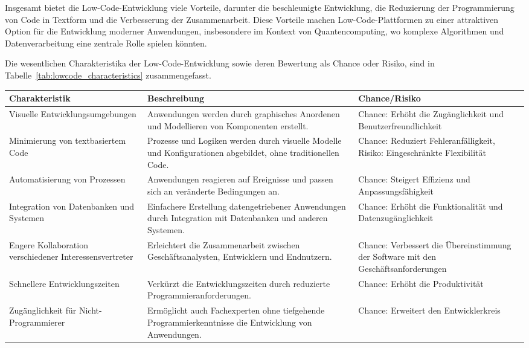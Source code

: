 Insgesamt bietet die Low-Code-Entwicklung viele Vorteile, darunter die beschleunigte Entwicklung, die Reduzierung 
der Programmierung von Code in Textform und die Verbesserung der Zusammenarbeit. Diese Vorteile machen Low-Code-Plattformen zu einer 
attraktiven Option für die Entwicklung moderner Anwendungen, insbesondere im Kontext von Quantencomputing, wo 
komplexe Algorithmen und Datenverarbeitung eine zentrale Rolle spielen könnten.

Die wesentlichen Charakteristika der Low-Code-Entwicklung sowie deren Bewertung als Chance oder Risiko, sind in 
Tabelle~\ref{tab:lowcode_characteristics} zusammengefasst.

\begin{table}[h!]
    \centering
    \begin{tabular}{|p{4cm}|p{6cm}|p{4cm}|}
    \hline
    \textbf{Charakteristik} & \textbf{Beschreibung} & \textbf{Chance/Risiko} \\
    \hline
    Visuelle Entwicklungsumgebungen & Anwendungen werden durch graphisches Anordenen und Modellieren von Komponenten erstellt. & Chance: Erhöht die Zugänglichkeit und Benutzerfreundlichkeit \\
    \hline
    Minimierung von textbasiertem Code & Prozesse und Logiken werden durch visuelle Modelle und Konfigurationen abgebildet, ohne traditionellen Code. & Chance: Reduziert Fehleranfälligkeit, Risiko: Eingeschränkte Flexibilität \\
    \hline
    Automatisierung von Prozessen & Anwendungen reagieren auf Ereignisse und passen sich an veränderte Bedingungen an. & Chance: Steigert Effizienz und Anpassungsfähigkeit \\
    \hline
    Integration von Datenbanken und Systemen & Einfachere Erstellung datengetriebener Anwendungen durch Integration mit Datenbanken und anderen Systemen. & Chance: Erhöht die Funktionalität und Datenzugänglichkeit \\
    \hline
    Engere Kollaboration verschiedener Interessensvertreter & Erleichtert die Zusammenarbeit zwischen Geschäftsanalysten, Entwicklern und Endnutzern. & Chance: Verbessert die Übereinstimmung der Software mit den Geschäftsanforderungen \\
    \hline
    Schnellere Entwicklungszeiten & Verkürzt die Entwicklungszeiten durch reduzierte Programmieranforderungen. & Chance: Erhöht die Produktivität \\
    \hline
    Zugänglichkeit für Nicht-Programmierer & Ermöglicht auch Fachexperten ohne tiefgehende Programmierkenntnisse die Entwicklung von Anwendungen. & Chance: Erweitert den Entwicklerkreis \\

\end{tabular}
\end{table}
